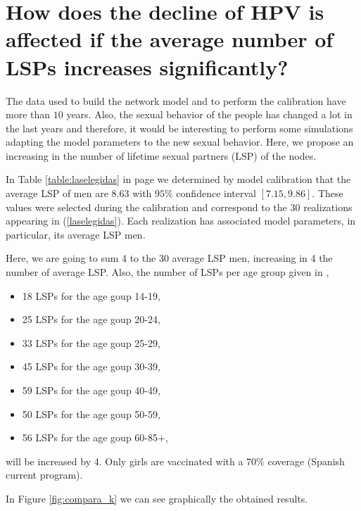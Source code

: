 \section{How does the decline of HPV is affected if the average number of LSPs increases significantly?}

The data used to build the network model and to perform the calibration have more than $10$ years. Also, the sexual behavior of the people has changed a lot in the last years and therefore, it would be interesting to perform some simulations adapting the model parameters to the new sexual behavior. Here, we propose an increasing in the number of lifetime sexual partners (LSP) of the nodes.

In Table \ref{table:laselegidas} in page \pageref{table:laselegidas} we determined by model calibration that the average LSP of men are $8.63$ with $95\%$ confidence interval $[7.15, 9.86]$. These values were selected during the calibration and correspond to the $30$  realizations appearing in (\ref{laselegidas}). Each realization has associated model parameters, in particular, its average LSP men.

Here, we are going to sum 4 to the $30$ average LSP men, increasing in 4 the number of average LSP. Also, the number of LSPs per age group given in \cite{Durex2002}, 

\begin{itemize}
\item 18 LSPs for the age goup 14-19,
\item 25 LSPs for the age goup 20-24,
\item 33 LSPs for the age goup 25-29,
\item 45 LSPs for the age goup 30-39,
\item 59 LSPs for the age goup 40-49,
\item 50 LSPs for the age goup 50-59,
\item 56 LSPs for the age goup 60-85+,
\end{itemize}

will be increased by 4. Only girls are vaccinated with a $70\%$ coverage (Spanish current program).

In Figure \ref{fig:compara_k} we can see graphically the obtained results. 

